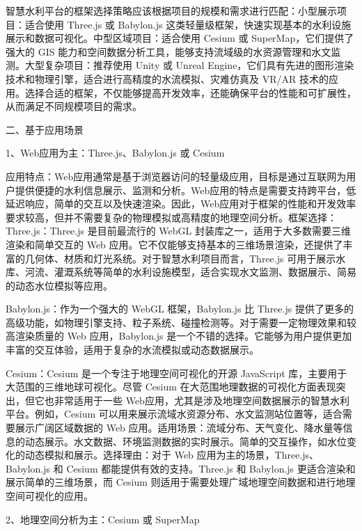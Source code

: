 智慧水利平台的框架选择策略应该根据项目的规模和需求进行匹配：小型展示项目：适合使用 Three.js 或 Babylon.js 这类轻量级框架，快速实现基本的水利设施展示和数据可视化。中型区域项目：适合使用 Cesium 或 SuperMap，它们提供了强大的 GIS 能力和空间数据分析工具，能够支持流域级的水资源管理和水文监测。大型复杂项目：推荐使用 Unity 或 Unreal Engine，它们具有先进的图形渲染技术和物理引擎，适合进行高精度的水流模拟、灾难仿真及 VR/AR 技术的应用。选择合适的框架，不仅能够提高开发效率，还能确保平台的性能和可扩展性，从而满足不同规模项目的需求。

二、基于应用场景

1、Web应用为主：Three.js、Babylon.js 或 Cesium

应用特点：Web应用通常是基于浏览器访问的轻量级应用，目标是通过互联网为用户提供便捷的水利信息展示、监测和分析。Web应用的特点是需要支持跨平台，低延迟响应，简单的交互以及快速渲染。因此，Web应用对于框架的性能和开发效率要求较高，但并不需要复杂的物理模拟或高精度的地理空间分析。框架选择：Three.js：Three.js 是目前最流行的 WebGL 封装库之一，适用于大多数需要三维渲染和简单交互的 Web 应用。它不仅能够支持基本的三维场景渲染，还提供了丰富的几何体、材质和灯光系统。对于智慧水利项目而言，Three.js 可用于展示水库、河流、灌溉系统等简单的水利设施模型，适合实现水文监测、数据展示、简易的动态水位模拟等应用。

Babylon.js：作为一个强大的 WebGL 框架，Babylon.js 比 Three.js 提供了更多的高级功能，如物理引擎支持、粒子系统、碰撞检测等。对于需要一定物理效果和较高渲染质量的 Web 应用，Babylon.js 是一个不错的选择。它能够为用户提供更加丰富的交互体验，适用于复杂的水流模拟或动态数据展示。

Cesium：Cesium 是一个专注于地理空间可视化的开源 JavaScript 库，主要用于大范围的三维地球可视化。尽管 Cesium 在大范围地理数据的可视化方面表现突出，但它也非常适用于一些 Web应用，尤其是涉及地理空间数据展示的智慧水利平台。例如，Cesium 可以用来展示流域水资源分布、水文监测站位置等，适合需要展示广阔区域数据的 Web 应用。适用场景：流域分布、天气变化、降水量等信息的动态展示。水文数据、环境监测数据的实时展示。简单的交互操作，如水位变化的动态模拟和展示。选择理由：对于 Web 应用为主的场景，Three.js、Babylon.js 和 Cesium 都能提供有效的支持。Three.js 和 Babylon.js 更适合渲染和展示简单的三维场景，而 Cesium 则适用于需要处理广域地理空间数据和进行地理空间可视化的应用。

2、地理空间分析为主：Cesium 或 SuperMap

